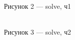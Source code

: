\documentclass[a4paper,12pt]{article}
\begin{document}
{{\begin{itemize}
\begin{figure}[h!]
	{\\Рисунок 2 — solve, ч1}
\end{figure}
\newpage 
\begin{figure}[h!]
	{\\Рисунок 3 — solve, ч2}
\end{figure}
\newpage 
\begin{figure}[h!]

\end{figure}
\end{itemize}}}
\end{document}
